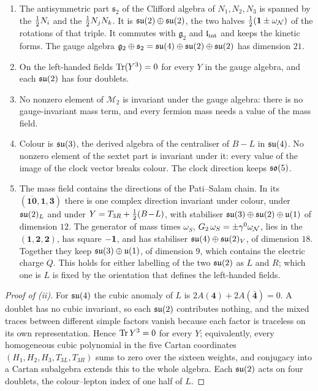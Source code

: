 \begin{theorem}
\label{thm:ps}
\begin{enumerate}[label=(\roman*),leftmargin=2.2em,itemsep=1pt]
\item The antisymmetric part $\mathfrak s_2$ of the Clifford algebra of $N_1,N_2,N_3$ is spanned by the $\tfrac12 N_i$ and the $\tfrac12 N_jN_k$.
It is $\mathfrak{su}(2)\oplus\mathfrak{su}(2)$, the two halves $\tfrac12(\mathbf 1\pm\omega_\mathcal N)$ of the rotations of that triple. It commutes with $\mathfrak g_2$ and $\mathfrak l_{\rm int}$ and keeps the kinetic
forms. The gauge algebra $\mathfrak g_2\oplus\mathfrak s_2=\mathfrak{su}(4)\oplus\mathfrak{su}(2)\oplus\mathfrak{su}(2)$ has dimension $21$.
\item On the left-handed fields $\operatorname{Tr}(Y^3)=0$ for every $Y$ in the gauge algebra, and each $\mathfrak{su}(2)$ has four doublets.
\item No nonzero element of $\mathcal M_2$ is invariant under the gauge algebra: there is no gauge-invariant mass term, and every fermion mass
needs a value of the mass field.
\item Colour is $\mathfrak{su}(3)$, the derived algebra of the centraliser of $B\!-\!L$ in $\mathfrak{su}(4)$. No nonzero element of the sextet part is invariant
under it: every value of the image of the clock vector breaks colour. The clock direction keeps $\mathfrak{so}(5)$.
\item The mass field contains the directions of the Pati--Salam chain. In its $(\overline{\mathbf{10}},\mathbf1,\mathbf3)$ there is one
complex direction invariant under colour, under $\mathfrak{su}(2)_L$ and under $Y=T_{3R}+\tfrac12(B\!-\!L)$, with stabiliser $\mathfrak{su}(3)\oplus\mathfrak{su}(2)\oplus\mathfrak{u}(1)$ of
dimension $12$. The generator of mass times $\omega_S$, $G_2\,\omega_S=\pm\gamma^0\omega_\mathcal N$, lies in the $(\mathbf1,\mathbf2,\mathbf2)$, has
square $-\mathbf 1$, and has stabiliser $\mathfrak{su}(4)\oplus\mathfrak{su}(2)_V$, of dimension $18$. Together they keep $\mathfrak{su}(3)\oplus\mathfrak{u}(1)$, of dimension $9$, which contains
the electric charge $Q$. This holds for either labelling of the two $\mathfrak{su}(2)$ as $L$ and $R$; which one is $L$ is fixed by the orientation that
defines the left-handed fields.
\end{enumerate}
\end{theorem}

\begin{proof}[Proof of (ii)]
For $\mathfrak{su}(4)$ the cubic anomaly of $L$ is $2A(\mathbf4)+2A(\bar{\mathbf4})=0$. A doublet has no cubic invariant, so each $\mathfrak{su}(2)$ contributes
nothing, and the mixed traces between different simple factors vanish because each factor is traceless on its own representation. Hence
$\operatorname{Tr} Y^3=0$ for every $Y$; equivalently, every homogeneous cubic polynomial in the five Cartan coordinates $(H_1,H_2,H_3,T_{3L},T_{3R})$ sums to zero
over the sixteen weights, and conjugacy into a Cartan subalgebra extends this to the whole algebra. Each $\mathfrak{su}(2)$ acts on four doublets, the
colour--lepton index of one half of $L$.
\end{proof}

